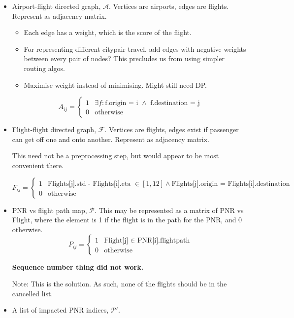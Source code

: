 \documentclass{article}
\providecommand{\sbrak}[1]{\ensuremath{\left[#1\right]}}
\begin{document}
\begin{flushleft}
\begin{itemize}
    \item Airport-flight directed graph, \(\mathcal{A}\). Vertices are airports, edges are flights. Represent as adjacency matrix. \begin{itemize}
        \item Each edge has a weight, which is the score of the flight. 
        \item For representing different citypair travel, add edges with negative weights between every pair of nodes? This precludes us from using simpler routing algos.
        \item Maximise weight instead of minimising. Might still need DP.
    \end{itemize}

\[A_{ij} = \begin{cases}
    1 & \exists f : \textrm{f.origin = i } \wedge \textrm{ f.destination = j} \\
    0 & \textrm{otherwise}
\end{cases}\]

    \item Flight-flight directed graph, \(\mathcal{F}\). Vertices are flights, edges exist if passenger can get off one and onto another. Represent as adjacency matrix.
    
    This need not be a preprocessing step, but would appear to be most convenient there.


\[F_{ij} = \begin{cases}
    1 & \textrm{Flights[j].std - Flights[i].eta } \in \sbrak{1, 12} \wedge \textrm{Flights[j].origin = Flights[i].destination} \\ %
    0 & \textrm{otherwise}
\end{cases}\]
    \item PNR vs flight path map, \(\mathcal{P}\). This may be represented as a matrix of PNR vs Flight, where the element is 1 if the flight is in the path for the PNR, and 0 otherwise. \[P_{ij} = \begin{cases}
        \textrm{1} & \textrm{Flight[j] \(\in\) PNR[i].flightpath} \\ %
        0 & \textrm{otherwise}
    \end{cases}\]

    \textbf{Sequence number thing did not work.}

    Note: This is the solution. As such, none of the flights should be in the cancelled list.
    \item A list of impacted PNR indices, \(\mathcal{P'}\).
    

\end{itemize}
\end{flushleft}
\end{document}
